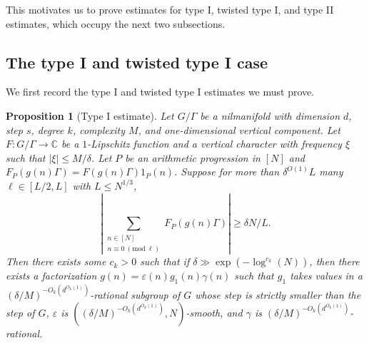\documentclass[11pt, a4paper]{amsart}
\newcommand{\nmod}[1]{~(\mathrm{mod}~#1)}
\theoremstyle{plain}
\theoremstyle{plain}
\newtheorem{proposition}{Proposition}
\theoremstyle{definition}
\theoremstyle{remark}
\numberwithin{equation}{section}
\numberwithin{lemma}{section}
\numberwithin{proposition}{section}
\numberwithin{corollary}{section}
\numberwithin{definition}{section}
\numberwithin{claim}{section}
\begin{document}
This motivates us to prove estimates for type I, twisted type I, and type II estimates, which occupy the next two subsections.


\subsection{The type I and twisted type I case}
We first record the type I and twisted type I estimates we must prove.
\begin{proposition}[Type I estimate]\label{p:type1}
Let $G/\Gamma$ be a nilmanifold with dimension $d$, step $s$, degree $k$, complexity $M$, and one-dimensional vertical component. Let $F\colon G/\Gamma \to \mathbb{C}$ be a $1$-Lipschitz function and a vertical character with frequency $\xi$ such that $|\xi| \le M/\delta$. Let $P$ be an arithmetic progression in $[N]$ and $F_P(g(n)\Gamma) = F(g(n)\Gamma)1_P(n)$. Suppose for more than $\delta^{O(1)}L$ many $\ell \in [L/2, L]$ with $L \le N^{1/3}$,
\begin{equation}\label{e:maintype1inequality}
\left|\sum_{\substack{n \in [N] \\ n \equiv 0 \nmod{\ell}}} F_P(g(n)\Gamma)\right| \ge \delta N/L.    
\end{equation}
Then there exists some $c_k > 0$ such that if $\delta \gg \exp(-\log^{c_k}(N))$, then there exists a factorization $g(n) = \varepsilon(n)g_1(n)\gamma(n)$ such that $g_1$ takes values in a $(\delta/M)^{-O_k(d^{O_k(1)})}$-rational subgroup of $G$ whose step is strictly smaller than the step of $G$, $\varepsilon$ is $((\delta/M)^{-O_k(d^{O_k(1)})}, N)$-smooth, and $\gamma$ is $(\delta/M)^{-O_k(d^{O_k(1)})}$-rational.
\end{proposition}
\end{document}
